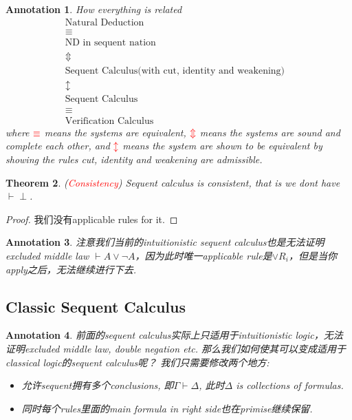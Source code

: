 \documentclass{article}
\theoremstyle{plain}
\newtheorem{theorem}{Theorem}
\newtheorem{annotation}[theorem]{Annotation}
\theoremstyle{nonumberplain}
\newtheorem{proof}{Proof}
\newcommand{\redt}[1]{\textcolor{red}{#1}}
\begin{document}
\begin{annotation}
\rm How everything is related
$$
\begin{array}{cc}
\text{Natural Deduction} \\
\equiv \\
\text{ND in sequent nation} \\
\Updownarrow \\
\text{Sequent Calculus(with cut, identity and weakening)}&\\
\updownarrow \\
\text{Sequent Calculus}& \\
\equiv \\
\text{Verification Calculus}
\end{array}
$$
where $\redt{\equiv}$ means the systems are equivalent, $\redt{\Updownarrow}$ means the systems are sound and complete each other, and $\redt{\updownarrow}$ means the system are shown to be equivalent by showing the rules cut, identity and weakening are admissible. 
\end{annotation}


\begin{theorem}
\rm (\redt{Consistency}) Sequent calculus is consistent, that is we dont have $\vdash \perp$. 
\end{theorem}

\begin{proof}
\rm 我们没有applicable rules for it. 
\end{proof}

\begin{annotation}
\rm 注意我们当前的intuitionistic sequent calculus也是无法证明excluded middle  law $\vdash A \vee \neg A$，因为此时唯一applicable rule是$\vee R_i$，但是当你apply之后，无法继续进行下去. 
\end{annotation}

\newpage
\subsection{Classic Sequent Calculus}

\begin{annotation}
\rm 前面的sequent calculus实际上只适用于intuitionistic logic，无法证明excluded middle law, double negation etc. 那么我们如何使其可以变成适用于classical logic的sequent calculus呢？ 我们只需要修改两个地方:
\begin{itemize}
	\item 允许sequent拥有多个conclusions, 即$\Gamma \vdash \Delta$, 此时$\Delta$ is collections of formulas.
	\item 同时每个rules里面的main formula in right side也在primise继续保留. 
\end{itemize}
\end{annotation}
\end{document}
